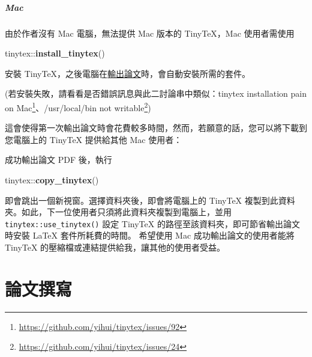 \documentclass[]{book}
\newenvironment{Shaded}{}{}
\newcommand{\KeywordTok}[1]{\textcolor[rgb]{0.00,0.44,0.13}{\textbf{#1}}}
\newcommand{\NormalTok}[1]{#1}
\newcommand{\OperatorTok}[1]{\textcolor[rgb]{0.40,0.40,0.40}{#1}}
\renewcommand{\href}[2]{#2\footnote{\url{#1}}}
\begin{document}
\hypertarget{sec:mac}{%
\paragraph{Mac}\label{sec:mac}}

由於作者沒有 Mac 電腦，無法提供 Mac 版本的 TinyTeX，Mac 使用者需使用

\begin{Shaded}
\begin{Highlighting}[]
\NormalTok{tinytex}\OperatorTok{::}\KeywordTok{install\_tinytex}\NormalTok{()}
\end{Highlighting}
\end{Shaded}

安裝
TinyTeX，之後電腦在\protect\hyperlink{export-thesis}{輸出論文}時，會自動安裝所需的套件。

(若安裝失敗，請看看是否錯誤訊息與此二討論串中類似：\href{https://github.com/yihui/tinytex/issues/92}{tinytex
installation pain on
Mac}、\href{https://github.com/yihui/tinytex/issues/24}{/usr/local/bin
not writable})

這會使得第一次輸出論文時會花費較多時間，然而，若願意的話，您可以將下載到您電腦上的
TinyTeX 提供給其他 Mac 使用者：

成功輸出論文 PDF 後，執行

\begin{Shaded}
\begin{Highlighting}[]
\NormalTok{tinytex}\OperatorTok{::}\KeywordTok{copy\_tinytex}\NormalTok{()}
\end{Highlighting}
\end{Shaded}

即會跳出一個新視窗。選擇資料夾後，即會將電腦上的 TinyTeX
複製到此資料夾。如此，下一位使用者只須將此資料夾複製到電腦上，並用
\texttt{tinytex::use\_tinytex()} 設定 TinyTeX
的路徑至該資料夾，即可節省輸出論文時安裝 LaTeX 套件所耗費的時間。
希望使用 Mac 成功輸出論文的使用者能將 TinyTeX
的壓縮檔或連結提供給我，讓其他的使用者受益。

\hypertarget{write-thesis}{%
\chapter{論文撰寫}\label{write-thesis}}
\end{document}
